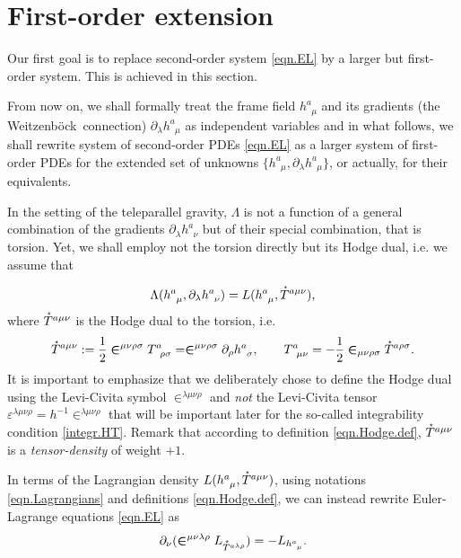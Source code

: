 \documentclass[
10pt, %
a4paper, %
oneside, %
headinclude,footinclude, %
BCOR5mm, %
]{scrartcl}
\newcommand{\pd}[1]{\partial_{#1}}
\newcommand{\tetrsymbol}{h}
\newcommand{\tetr}[2]{\tetrsymbol^{#1}_{\phantom{#1}#2}}
\newcommand{\detTetr}{\tetrsymbol}
\newcommand{\D}[1]{\partial_{#1}} %
\newcommand{\Tors}[2]{T^{#1}_{\phantom{a}#2}}
\newcommand{\We}{Weitzenb\"ock}
\newcommand{\Lag}{\Lambda}	%
\newcommand{\Laghodge}{L}%
\newcommand{\LCsymb}{\bm{\in}}    %
\newcommand{\LCtens}{\varepsilon} %
\newcommand{\HDT}[1]{\accentset{\star}{T}^{#1}}
\begin{document}
\section{First-order extension}\label{sec.PDEs}

Our first goal is to replace second-order system \eqref{eqn.EL} by a larger but first-order system. 
This is achieved in this section.

From now on, we shall formally treat the frame field $ \tetr{a}{\mu} $ and its gradients (the \We\ 
connection) $ 
\pd{\lambda}\tetr{a}{\mu} $ as independent variables and in what follows, we shall rewrite system 
of second-order PDEs \eqref{eqn.EL} as a larger system of first-order PDEs for the extended set of  
unknowns $ \{ \tetr{a}{\mu},\pd{\lambda}\tetr{a}{\mu} \} $, or actually, for their equivalents.

In the setting of the teleparallel gravity, $ \Lag $ is not a function of a general combination of 
the gradients $ \pd{\lambda}\tetr{a}{\nu} $ but of their special combination, that is torsion. Yet, 
we shall employ not the torsion directly but its Hodge dual, i.e. we assume that

\begin{equation}\label{eqn.Lagrangians}
	\Lag(\tetr{a}{\mu},\pd{\lambda}\tetr{a}{\nu}) = 
	\Laghodge(\tetr{a}{\mu},\HDT{a\mu\nu}),
\end{equation}
where $ \HDT{a\mu\nu} $ is the Hodge dual to the 
torsion, i.e.
\begin{equation}\label{eqn.Hodge.def}
	\HDT{a\mu\nu} := \frac{1}{2}\LCsymb^{\mu\nu\rho\sigma}\Tors{a}{\rho\sigma} = 
	\LCsymb^{\mu\nu\rho\sigma}\D{\rho}\tetr{a}{\sigma}, \qquad \Tors{a}{\mu\nu} = 
	-\frac{1}{2}\LCsymb_{\mu\nu\rho\sigma}\HDT{a\rho\sigma}.
\end{equation}
It is important to emphasize that we deliberately chose to define the Hodge dual using the 
Levi-Civita symbol $ 
\LCsymb^{\lambda\mu\nu\rho} $ and \emph{not} the Levi-Civita tensor $ \LCtens^{\lambda\mu\nu\rho} = 
\detTetr^{-1} 
\LCsymb^{\lambda\mu\nu\rho} $ that will be important later for 
the so-called integrability condition \eqref{integr.HT}.
Remark that according to definition \eqref{eqn.Hodge.def}, $ \HDT{a\mu\nu} $ is a  
\emph{tensor-density} of weight $ +1 $.


In terms of the Lagrangian density $ \Laghodge(\tetr{a}{\mu},\HDT{a\mu\nu}) 
$, using notations 
\eqref{eqn.Lagrangians} and definitions 
\eqref{eqn.Hodge.def}, we can instead
rewrite Euler-Lagrange equations \eqref{eqn.EL} as
\begin{equation}\label{eqn.EM.Hodge}
\D{\nu}(\LCsymb^{\mu\nu\lambda\rho}\Laghodge_{\HDT{a\lambda\rho}}) 
=-\Laghodge_{\tetr{a}{\mu}}.
\end{equation}
\end{document}
